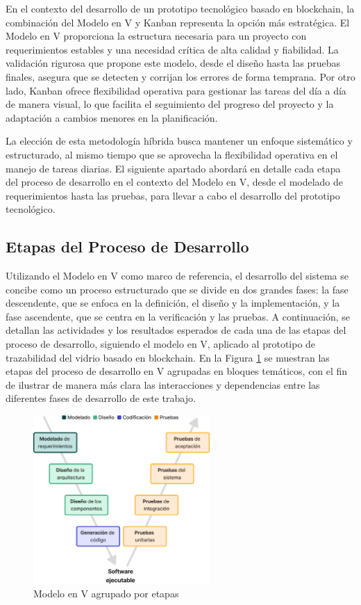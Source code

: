 En el contexto del desarrollo de un prototipo tecnológico basado en blockchain, la combinación del Modelo en V y Kanban representa la opción más estratégica. El Modelo en V proporciona la estructura necesaria para un proyecto con requerimientos estables y una necesidad crítica de alta calidad y fiabilidad. La validación rigurosa que propone este modelo, desde el diseño hasta las pruebas finales, asegura que se detecten y corrijan los errores de forma temprana. Por otro lado, Kanban ofrece flexibilidad operativa para gestionar las tareas del día a día de manera visual, lo que facilita el seguimiento del progreso del proyecto y la adaptación a cambios menores en la planificación.

La elección de esta metodología híbrida busca mantener un enfoque sistemático y estructurado, al mismo tiempo que se aprovecha la flexibilidad operativa en el manejo de tareas diarias. El siguiente apartado abordará en detalle cada etapa del proceso de desarrollo en el contexto del Modelo en V, desde el modelado de requerimientos hasta las pruebas, para llevar a cabo el desarrollo del prototipo tecnológico.

\subsection{Etapas del Proceso de Desarrollo}

Utilizando el Modelo en V como marco de referencia, el desarrollo del sistema se concibe como un proceso estructurado que se divide en dos grandes fases: la fase descendente, que se enfoca en la definición, el diseño y la implementación, y la fase ascendente, que se centra en la verificación y las pruebas. A continuación, se detallan las actividades y los resultados esperados de cada una de las etapas del proceso de desarrollo, siguiendo el modelo en V, aplicado al prototipo de trazabilidad del vidrio basado en blockchain. En la Figura \ref{fig:methodology-v-grouped} se muestran las etapas del proceso de desarrollo en V agrupadas en bloques temáticos, con el fin de ilustrar de manera más clara las interacciones y dependencias entre las diferentes fases de desarrollo de este trabajo.

\begin{figure}[!b]
	\centering
	\includegraphics[width=0.6\textwidth]{Figures/model-v-grouped.png}
	\caption{Modelo en V agrupado por etapas}
    \label{fig:methodology-v-grouped}
\end{figure}


